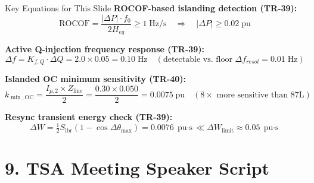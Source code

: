 \documentclass[12pt,a4paper]{article}
\begin{document}
\begin{formulabox}{Key Equations for This Slide}
\textbf{ROCOF-based islanding detection (TR-39):}
\begin{equation}
  \text{ROCOF} = \frac{|\Delta P| \cdot f_0}{2 H_{eq}} \geq 1 \;\text{Hz/s}
  \quad \Rightarrow \quad |\Delta P| \geq 0.02 \;\text{pu}
\end{equation}

\textbf{Active Q-injection frequency response (TR-39):}
\begin{equation}
  \Delta f = K_{f,Q} \cdot \Delta Q = 2.0 \times 0.05 = 0.10 \;\text{Hz}
  \quad (\text{detectable vs. floor } \Delta f_{resol} = 0.01 \;\text{Hz})
\end{equation}

\textbf{Islanded OC minimum sensitivity (TR-40):}
\begin{equation}
  k_{\min,\text{OC}} = \frac{I_{p,2} \times Z_\text{line}}{2}
  = \frac{0.30 \times 0.050}{2} = 0.0075 \;\text{pu}
  \quad (\text{8$\times$ more sensitive than 87L})
\end{equation}

\textbf{Resync transient energy check (TR-39):}
\begin{equation}
  \Delta W = \tfrac{1}{2} S_\text{ibr}(1 - \cos\Delta\theta_\text{max})
  = 0.0076 \;\text{pu$\cdot$s} \ll \Delta W_\text{limit} \approx 0.05 \;\text{pu$\cdot$s}
\end{equation}
\end{formulabox}

\section{9.\; TSA Meeting Speaker Script}
\end{document}
